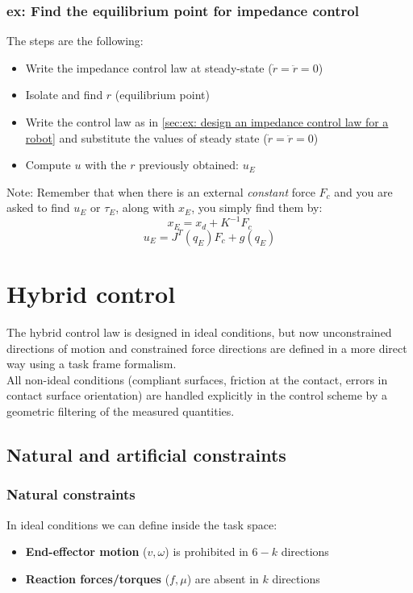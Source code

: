 \documentclass[a4paper,12pt]{article}
\begin{document}
\subsubsection{ex: Find the equilibrium point for impedance control}
The steps are the following:
\begin{itemize}
\item Write the impedance control law at steady-state ($\dot{r}=\ddot{r}=0$)
\item Isolate and find $r$ (equilibrium point)
\item Write the control law as in \ref{sec:ex: design an impedance control law for a robot}
and substitute the values of steady state ($\dot{r}=\ddot{r}=0$)
\item Compute $u$ with the $r$ previously obtained: $u_E$
\end{itemize}

Note: Remember that when there is an external \textit{constant} force $F_{c}$ and
you are asked to find $u_E$ or $\tau_E$, along with $x_E$, you simply find them by:
\begin{equation}
    x_E = x_d + K^{-1}F_{c}
\end{equation}
\begin{equation}
    u_E = J^T(q_E) F_{c} + g(q_E)
\end{equation}





\section{Hybrid control}
The hybrid control law is designed in ideal conditions, but now
unconstrained directions of motion and constrained force directions
are defined in a more direct way using a task frame formalism.\\
All non-ideal conditions (compliant surfaces, friction at the contact,
errors in contact surface orientation) are handled explicitly in the
control scheme by a geometric filtering of the measured quantities.
\subsection{Natural and artificial constraints}
\subsubsection{Natural constraints}
In ideal conditions we can define inside the task space:
\begin{itemize}
\item \textbf{End-effector motion} ($v,\omega$) is prohibited 
in $6-k$ directions
\item \textbf{Reaction forces/torques} ($f,\mu$) are absent 
in $k$ directions
\end{itemize}
\end{document}
